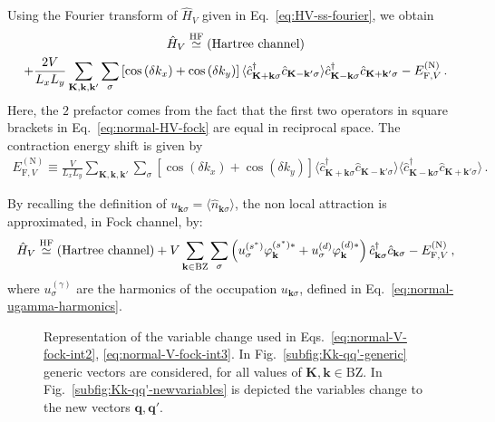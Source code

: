 Using the Fourier transform of $\hat H_V$ given in Eq.~\eqref{eq:HV-ss-fourier}, we obtain
\begin{multline}
	\hat H_V \stackrel{\mathrm{HF}}{\simeq} (\text{Hartree channel}) \\
	+ \frac{2V}{L_x L_y} \sum_{\mathbf{K}, \mathbf{k}, \mathbf{k}'} \sum_\sigma \left[
	\cos \left(
	\delta k_x
	\right)	+ \cos \left(
	\delta k_y
	\right)	
	\right]
	\langle
	\hat c_{\mathbf{K}+\mathbf{k} \sigma}^\dagger 
	\hat c_{\mathbf{K}-\mathbf{k}' \sigma}
	\rangle
	\hat c_{\mathbf{K}-\mathbf{k} \sigma}^\dagger  \hat c_{\mathbf{K}+\mathbf{k}'\sigma} - E_{\mathrm{F},V}^{(\mathrm{N})} \, . \label{eq:normal-V-fock-int1}
\end{multline}
Here, the $2$ prefactor comes from the fact that the first two operators in square brackets in Eq.~\eqref{eq:normal-HV-fock} are equal in reciprocal space. The contraction energy shift is given by
\begin{align}\label{eq:normal-V-fock-double-counting}
	E_{\mathrm{F},V}^{(\mathrm{N})} \equiv \frac{V}{L_x L_y} \sum_{\mathbf{K}, \mathbf{k}, \mathbf{k}'} \sum_\sigma \left[
		\cos \left(
			\delta k_x
		\right)	+ \cos \left(
			\delta k_y
		\right)	
	\right]
	\langle
		\hat c_{\mathbf{K}+\mathbf{k} \sigma}^\dagger 
	\hat c_{\mathbf{K}-\mathbf{k}' \sigma}
	\rangle \langle
		\hat c_{\mathbf{K}-\mathbf{k} \sigma}^\dagger  \hat c_{\mathbf{K}+\mathbf{k}'\sigma} 
	\rangle \, .
\end{align}

By recalling the definition of $u_{\mathbf{k}\sigma} = \langle \hat n_{\mathbf{k}\sigma} \rangle$, the non local attraction is approximated, in Fock channel, by:
\begin{equation}\label{eq:normal-HV-fock-approx}
	\hat H_V \stackrel{\mathrm{HF}}{\simeq} (\text{Hartree channel}) + 
	V
	\sum_{\mathbf{k}\in\mathrm{BZ}} \sum_\sigma
	\left(
		u^{(s^*)}_\sigma
		\varphi_\mathbf{k}^{(s^*)*} + u^{(d)}_\sigma
		\varphi_\mathbf{k}^{(d)*}
	\right)
	\hat c_{\mathbf{k}\sigma}^\dagger
	\hat c_{\mathbf{k}\sigma} - E_{\mathrm{F},V}^{(\mathrm{N})} \, ,
\end{equation}
where $u_\sigma^{(\gamma)}$ are the harmonics of the occupation $u_{\mathbf{k}\sigma}$, defined in Eq.~\eqref{eq:normal-ugamma-harmonics}.

\begin{figure}
	\def\Kx{0.5}
	\def\Ky{0.2}
	\def\kx{0.1}
	\def\ky{0.7}
	\centering
	\caption{Representation of the variable change used in Eqs.~\eqref{eq:normal-V-fock-int2}, \eqref{eq:normal-V-fock-int3}. In Fig.~\ref{subfig:Kk-qq'-generic} generic vectors are considered, for all values of $\mathbf{K},\mathbf{k}\in\mathrm{BZ}$. In Fig.~\ref{subfig:Kk-qq'-newvariables} is depicted the variables change to the new vectors $\mathbf{q},\mathbf{q}'$.}
	\label{fig:Kk-qq'}
\end{figure}

